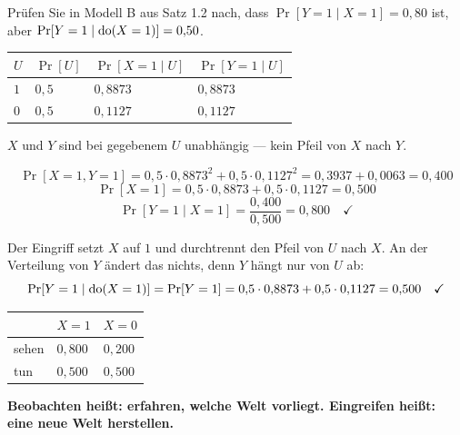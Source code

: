 \begin{aufgabe}
Prüfen Sie in Modell B aus Satz 1.2 nach, dass $\Pr[Y=1\mid X=1] = 0{,}80$ ist, aber $\Pr[Y=1\mid\operatorname{do}(X=1)] = 0{,}50$.

\loesung
{}
\begin{center}
{\small
\renewcommand{\arraystretch}{1.48}
\begin{tabular}{@{}P{1.6cm}P{2.0cm}P{2.4cm}P{2.4cm}@{}}
\toprule
$U$ & $\Pr[U]$ & $\Pr[X=1\mid U]$ & $\Pr[Y=1\mid U]$\\
\midrule
$1$ & $0{,}5$ & $0{,}8873$ & $0{,}8873$\\
$0$ & $0{,}5$ & $0{,}1127$ & $0{,}1127$\\
\bottomrule
\end{tabular}}
\end{center}
$X$ und $Y$ sind bei gegebenem $U$ unabhängig --- kein Pfeil von $X$ nach $Y$.

\[ \Pr[X=1,Y=1] = 0{,}5\cdot0{,}8873^{2} + 0{,}5\cdot0{,}1127^{2} = 0{,}3937 + 0{,}0063 = 0{,}400 \]
\[ \Pr[X=1] = 0{,}5\cdot0{,}8873 + 0{,}5\cdot0{,}1127 = 0{,}500 \]
\[ \Pr[Y=1 \mid X=1] = \frac{0{,}400}{0{,}500} = 0{,}800 \quad \checkmark \]

Der Eingriff setzt $X$ auf $1$ und durchtrennt den Pfeil von $U$ nach $X$. An der Verteilung von $Y$ ändert das nichts, denn $Y$ hängt nur von $U$ ab:
\[ \Pr[Y=1\mid\operatorname{do}(X=1)] = \Pr[Y=1] = 0{,}5\cdot0{,}8873 + 0{,}5\cdot0{,}1127 = 0{,}500 \quad \checkmark \]

\begin{center}
{\small
\renewcommand{\arraystretch}{1.5}
\begin{tabular}{@{}P{2.6cm}P{2.2cm}P{2.2cm}@{}}
\toprule
& $X=1$ & $X=0$\\
\midrule
sehen & $0{,}800$ & $0{,}200$\\
tun & $0{,}500$ & $0{,}500$\\
\bottomrule
\end{tabular}}
\end{center}

\begin{center}
\begin{minipage}{0.88\textwidth}
\end{minipage}
\end{center}

\begin{center}
\begin{minipage}{0.9\textwidth}
\textbf{Beobachten heißt: erfahren, welche Welt vorliegt. Eingreifen heißt: eine neue Welt herstellen.}
\end{minipage}
\end{center}
\end{aufgabe}

